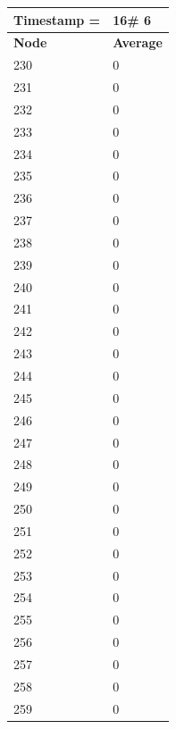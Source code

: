 \begin{tabular}{|l||l|}
\hline
\textbf{Timestamp =} & \textbf{16}\# 6\\\hline
	\textbf{Node} & \textbf{Average} \\ \hline
\hline
	230 & 0 \\ \hline
	231 & 0 \\ \hline
	232 & 0 \\ \hline
	233 & 0 \\ \hline
	234 & 0 \\ \hline
	235 & 0 \\ \hline
	236 & 0 \\ \hline
	237 & 0 \\ \hline
	238 & 0 \\ \hline
	239 & 0 \\ \hline
	240 & 0 \\ \hline
	241 & 0 \\ \hline
	242 & 0 \\ \hline
	243 & 0 \\ \hline
	244 & 0 \\ \hline
	245 & 0 \\ \hline
	246 & 0 \\ \hline
	247 & 0 \\ \hline
	248 & 0 \\ \hline
	249 & 0 \\ \hline
	250 & 0 \\ \hline
	251 & 0 \\ \hline
	252 & 0 \\ \hline
	253 & 0 \\ \hline
	254 & 0 \\ \hline
	255 & 0 \\ \hline
	256 & 0 \\ \hline
	257 & 0 \\ \hline
	258 & 0 \\ \hline
	259 & 0 \\ \hline
\end{tabular}

